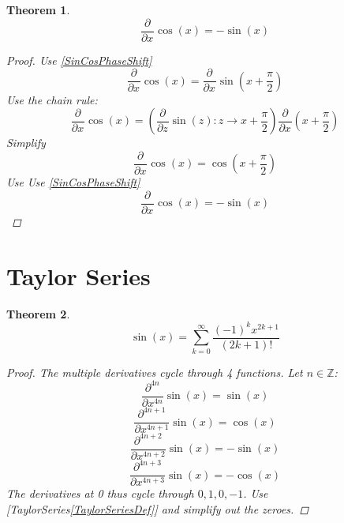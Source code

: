 \documentclass[]{article}
\newcommand{\pqty}[1]{{\left(#1\right)}}
\newcommand{\pdiff}[2]{\frac{\partial^{#2}}{\partial #1^{#2}}}
\newtheorem{theorem}{Theorem}[section]
\numberwithin{equation}{section}
\begin{document}
	\begin{theorem}
		\begin{equation}
		\label{key}
		\pdiff{x}{}\cos\pqty{x}=-\sin\pqty{x}
		\end{equation}
		\begin{proof}
			Use \eqref{SinCosPhaseShift}
			\begin{equation}
			\pdiff{x}{}\cos\pqty{x}=\pdiff{x}{}\sin\pqty{x+\frac{\pi}{2}}
			\end{equation}
			Use the chain rule:
			\begin{equation}
			\pdiff{x}{}\cos\pqty{x}=
			\pqty{\pdiff{z}{}\sin\pqty{z}:z\to x+\frac{\pi}{2}}
			\pdiff{x}{}\pqty{x+\frac{\pi}{2}}
			\end{equation}
			Simplify
			\begin{equation}
			\pdiff{x}{}\cos\pqty{x}=
			\cos\pqty{x+\frac{\pi}{2}}
			\end{equation}
			Use 
			Use \eqref{SinCosPhaseShift}
			\begin{equation}
			\pdiff{x}{}\cos\pqty{x}=
			-\sin\pqty{x}
			\end{equation}
		\end{proof}
	\end{theorem}

	\section{Taylor Series}
	\begin{theorem}
		\begin{equation}
		\label{SinTaylor}
		\sin\pqty{x}=\sum_{k=0}^{\infty} \frac{\pqty{-1}^kx^{2k+1}}{\pqty{2k+1}!}
		\end{equation}
		\begin{proof}
			The multiple derivatives cycle through 4 functions. Let \(n\in\mathbb{Z}\):
			\begin{equation}
				\pdiff{x}{4n}\sin\pqty{x}=\sin\pqty{x}
			\end{equation}
			\begin{equation}
				\pdiff{x}{4n+1}\sin\pqty{x}=\cos\pqty{x}
			\end{equation}
			\begin{equation}
				\pdiff{x}{4n+2}\sin\pqty{x}=-\sin\pqty{x}
			\end{equation}
			\begin{equation}
				\pdiff{x}{4n+3}\sin\pqty{x}=-\cos\pqty{x}
			\end{equation}
			The derivatives at 0 thus cycle through \(0,1,0,-1\). Use [TaylorSeries\eqref{TaylorSeriesDef}] and simplify out the zeroes.
		\end{proof}
	\end{theorem}
\end{document}

